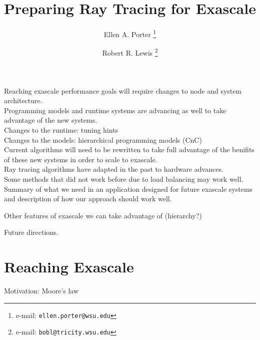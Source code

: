 \documentclass{vgtc}                          %
\title{Preparing Ray Tracing for Exascale}
\author{
  Ellen A. Porter
  \thanks{e-mail: \texttt{ellen.porter@wsu.edu}} %
  \and
  Robert R. Lewis
  \thanks{e-mail: \texttt{bobl@tricity.wsu.edu}}}
\affiliation{
  \scriptsize Washington State University, Tri-Cities \\
  Program in Engineering and Computer Science}
\begin{document}


\maketitle


Reaching exascale performance goals will require changes to node 
and system architecture. \\

Programming models and runtime systems are advancing as well to 
take advantage of the new systems. \\

Changes to the runtime: tuning hints \\
Changes to the models:  hierarchical programming models (CnC) \\

Current algorithms will need to be rewritten to take full advantage 
of the benifits of these new systems in order to scale to exascale. \\

Ray tracing algorithms have adapted in the past to hardware advances. \\

Some methods that did not work before due to load balancing may work well. \\

Summary of what we need in an application designed for future exascale systems 
and description of how our approach should work well.

Other features of exascale we can take advantage of (hierarchy?)

Future directions. \\

\section{Reaching Exascale}
Motivation: Moore's law
\end{document}
